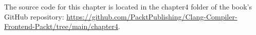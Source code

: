 The source code for this chapter is located in the chapter4 folder of the book's GitHub repository: \url{https://github.com/PacktPublishing/Clang-Compiler-Frontend-Packt/tree/main/chapter4}.
